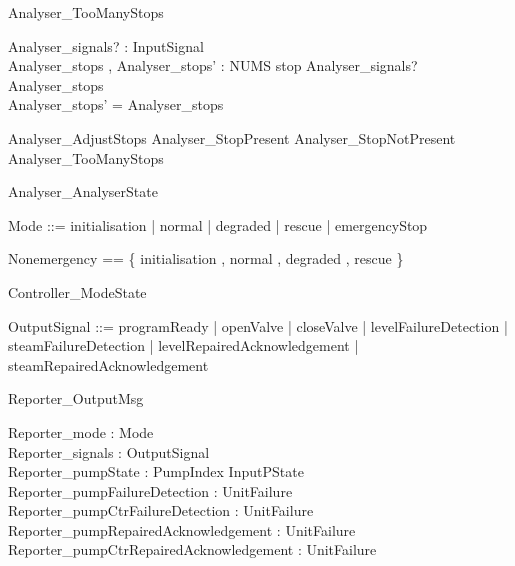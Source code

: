\documentclass{article}
\begin{document}
\begin{schema}{Analyser\_TooManyStops}

 Analyser\_signals? : \power InputSignal \\
 Analyser\_stops , Analyser\_stops' : NUMS 
\where
 stop \notin Analyser\_signals? \land Analyser\_stops  \\
 Analyser\_stops' = Analyser\_stops
\end{schema}

\begin{zed}
	Analyser\_AdjustStops  Analyser\_StopPresent \lor Analyser\_StopNotPresent \lor Analyser\_TooManyStops
\end{zed}

\begin{zed}
	Analyser\_AnalyserState 
\end{zed}

\begin{zed}
	Mode ::= initialisation | normal | degraded | rescue | emergencyStop
\end{zed}

\begin{zed}
	Nonemergency == \{ initialisation , normal , degraded , rescue \}
\end{zed}

\begin{zed}
	Controller\_ModeState 
\end{zed}

\begin{zed}
	OutputSignal ::= programReady | openValve | closeValve | levelFailureDetection | steamFailureDetection | levelRepairedAcknowledgement | steamRepairedAcknowledgement
\end{zed}

\begin{schema}{Reporter\_OutputMsg}

 Reporter\_mode : Mode \\
 Reporter\_signals : \power OutputSignal \\
 Reporter\_pumpState : PumpIndex \fun InputPState \\
 Reporter\_pumpFailureDetection : \power UnitFailure \\
 Reporter\_pumpCtrFailureDetection : \power UnitFailure \\
 Reporter\_pumpRepairedAcknowledgement : \power UnitFailure \\
 Reporter\_pumpCtrRepairedAcknowledgement : \power UnitFailure
\end{schema}
\end{document}
